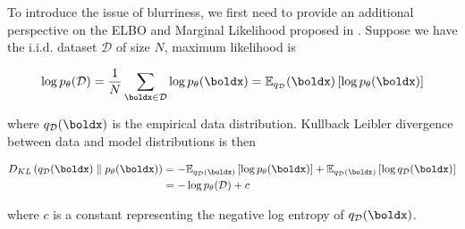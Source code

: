 

To introduce the issue of blurriness, we first need to provide an additional perspective on the ELBO and Marginal Likelihood proposed in \cite{VAEIntro}. Suppose we have the i.i.d. dataset \(\mathcal{D}\) of size \(N\), maximum likelihood is

\begin{equation}
    \log p_\theta(\mathcal{D}) = \frac{1}{N}\sum_{\boldx \in \mathcal{D}} \log p_\theta(\boldx) = \mathbb{E}_{q_{\mathcal{D}}}(\boldx)\left[\log p_\theta(\boldx)\right]
\end{equation}

where \(q_{\mathcal{D}}(\boldx)\) is the empirical data distribution. Kullback Leibler divergence between data and model distributions is then

\begin{align}
    D_{KL}\left(q_\mathcal{D}(\boldx) \parallel p_\theta(\boldx)\right) 
    &= -\mathbb{E}_{q_\mathcal{D}(\boldx)}\left[\log p_\theta(\boldx)\right] + \mathbb{E}_{q_{\mathcal{D}}(\boldx)}\left[\log q_{\mathcal{D}}(\boldx)\right] \nonumber \\
    &= -\log p_\theta(\mathcal{D}) + c
\end{align}

where \(c\) is a constant representing the negative log entropy of \(q_\mathcal{D}(\boldx)\).

